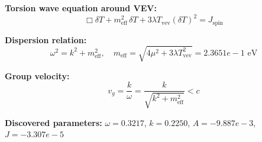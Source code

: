 
\textbf{Torsion wave equation around VEV:}
\begin{equation}
  \Box \delta T + m_{\text{eff}}^2 \, \delta T + 3\lambda T_{\text{vev}} (\delta T)^2 = J_{\text{spin}}
\end{equation}

\textbf{Dispersion relation:}
\begin{equation}
  \omega^2 = k^2 + m_{\text{eff}}^2, \quad
  m_{\text{eff}} = \sqrt{4\mu^2 + 3\lambda T_{\text{vev}}^2} = 2.3651e-1 \text{ eV}
\end{equation}

\textbf{Group velocity:}
\begin{equation}
  v_g = \frac{k}{\omega} = \frac{k}{\sqrt{k^2 + m_{\text{eff}}^2}} < c
\end{equation}

\textbf{Discovered parameters:}
$\omega = 0.3217$, \quad
$k = 0.2250$, \quad
$A = -9.887e-3$, \quad
$J = -3.307e-5$